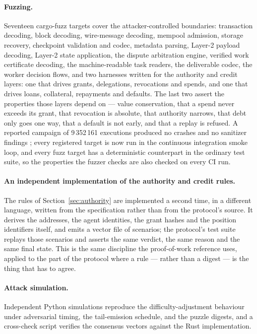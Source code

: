 \documentclass{article}
\begin{document}
\paragraph{Fuzzing.} Seventeen cargo-fuzz targets cover the attacker-controlled
boundaries: transaction decoding, block decoding, wire-message decoding,
mempool admission, storage recovery, checkpoint validation and codec, metadata
parsing, Layer-2 payload decoding, Layer-2 state application, the dispute
arbitration engine, verified work certificate decoding, the machine-readable
task readers, the deliverable codec, the worker decision flows, and two
harnesses written for the authority and credit layers: one that drives grants,
delegations, revocations and spends, and one that drives loans, collateral,
repayments and defaults. The last two assert the properties those layers
depend on --- value conservation, that a spend never exceeds its grant, that
revocation is absolute, that authority narrows, that debt only goes one way,
that a default is not early, and that a replay is refused. A reported campaign
of 9\,352\,161
executions produced no crashes and no sanitizer findings
\cite{jounit-fuzz}; every registered target is now run in the continuous
integration smoke loop, and every fuzz target has a deterministic counterpart in
the ordinary test suite, so the properties the fuzzer checks are also checked on
every CI run.

\paragraph{An independent implementation of the authority and credit rules.}
The rules of Section~\ref{sec:authority} are implemented a second time, in a
different language, written from the specification rather than from the
protocol's source. It derives the addresses, the agent identities, the grant
hashes and the position identifiers itself, and emits a vector file of
scenarios; the protocol's test suite replays those scenarios and asserts the
same verdict, the same reason and the same final state. This is the same
discipline the proof-of-work reference uses, applied to the part of the
protocol where a rule --- rather than a digest --- is the thing that has to
agree.

\paragraph{Attack simulation.} Independent Python simulations reproduce the
difficulty-adjustment behaviour under adversarial timing, the tail-emission
schedule, and the puzzle digests, and a cross-check script verifies the
consensus vectors against the Rust implementation.
\end{document}
